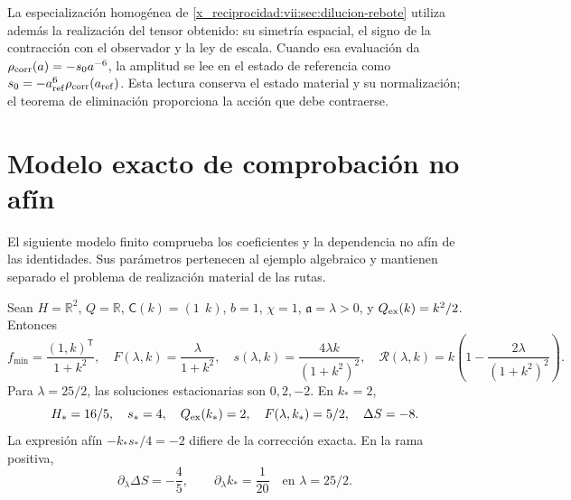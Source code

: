La especialización homogénea de
\ref{x_reciprocidad:vii:sec:dilucion-rebote} utiliza además la realización del
tensor obtenido: su simetría espacial, el signo de la contracción
con el observador y la ley de escala. Cuando esa evaluación da
\(\rho_{\rm corr}(a)=-s_0a^{-6}\), la amplitud se lee en el
estado de referencia como
\(s_0=-a_{\rm ref}^{6}\rho_{\rm corr}(a_{\rm ref})\).
Esta lectura conserva el estado material y su normalización; el
teorema de eliminación proporciona la acción que debe contraerse.

\section{Modelo exacto de comprobación no afín}
\label{x_reciprocidad:vii:subsec:control-no-afin}

El siguiente modelo finito comprueba los coeficientes y la
dependencia no afín de las identidades. Sus parámetros pertenecen
al ejemplo algebraico y mantienen separado el problema de
realización material de las rutas.

\begin{proposition}
\label{x_reciprocidad:vii:prop:ejemplo-no-afin}
Sean \(H=\mathbb R^2\), \(Q=\mathbb R\),
\(\mathsf C(k)=(1\ \ k)\), \(b=1\), \(\chi=1\),
\(\mathfrak a=\lambda>0\), y \(Q_{\rm ex}(k)=k^2/2\).
Entonces
\begin{equation}
 f_{\min}=\frac{(1,k)^{\mathsf T}}{1+k^2},\quad
 F(\lambda,k)=\frac{\lambda}{1+k^2},\quad
 s(\lambda,k)=\frac{4\lambda k}{(1+k^2)^2},\quad
 \mathcal R(\lambda,k)
    =k\left(1-\frac{2\lambda}{(1+k^2)^2}\right).
 \label{x_reciprocidad:vii:eq:ejemplo-minimo-no-afin}
\end{equation}
Para \(\lambda=25/2\), las soluciones estacionarias son
\(0,2,-2\). En \(k_*=2\),
\begin{equation}
 \mathsf H_*=\frac{16}{5},\quad s_*=4,\quad
 Q_{\rm ex}(k_*)=2,\quad F(\lambda,k_*)=\frac52,
 \quad \Delta S=-8.
 \label{x_reciprocidad:vii:eq:valores-ejemplo-no-afin}
\end{equation}
La expresión afín \(-k_*s_*/4=-2\) difiere de la corrección
exacta. En la rama positiva,
\begin{equation}
 \partial_\lambda\Delta S=-\frac45,
 \qquad \partial_\lambda k_* =\frac1{20}
 \quad\text{en }\lambda=25/2.
 \label{x_reciprocidad:vii:eq:derivadas-ejemplo-no-afin}
\end{equation}
\end{proposition}


